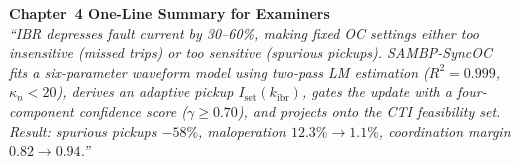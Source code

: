 \documentclass[12pt,a4paper]{article}
\newcommand{\kibr}{k_\mathrm{ibr}}
\newcommand{\Iset}{I_\mathrm{set}}
\begin{document}
\vspace{1em}
\begin{center}
\begin{tcolorbox}[colback=iitmnavy!10,colframe=iitmnavy,arc=4pt,boxrule=1pt,width=0.88\textwidth]
\centering
\textbf{Chapter~4 One-Line Summary for Examiners}\\[4pt]
\textit{``IBR depresses fault current by 30--60\%, making fixed OC settings either too insensitive (missed trips) or too sensitive (spurious pickups). SAMBP-SyncOC fits a six-parameter waveform model using two-pass LM estimation ($R^2 = 0.999$, $\kappa_n < 20$), derives an adaptive pickup $\Iset(\kibr)$, gates the update with a four-component confidence score ($\gamma \geq 0.70$), and projects onto the CTI feasibility set. Result: spurious pickups $-58\%$, maloperation $12.3\% \to 1.1\%$, coordination margin $0.82 \to 0.94$.''}
\end{tcolorbox}
\end{center}
\end{document}
